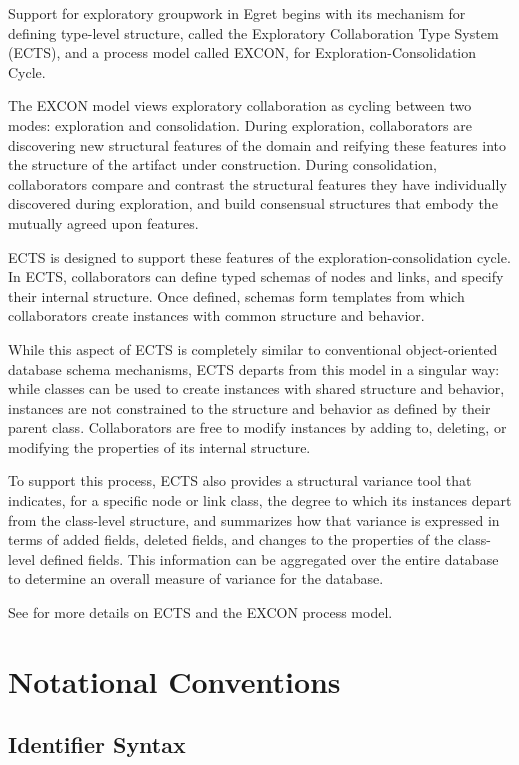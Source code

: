 Support for exploratory groupwork in Egret begins with its mechanism for
defining type-level structure, called the Exploratory Collaboration Type
System (ECTS), and a process model called EXCON, for 
Exploration-Consolidation Cycle.

The EXCON model views exploratory collaboration as cycling between two
modes: exploration and consolidation.  During exploration, collaborators are
discovering new structural features of the domain and reifying these features
into the structure of the artifact under construction.  During consolidation,
collaborators compare and contrast the structural features they have
individually discovered during exploration, and build consensual structures
that embody the mutually agreed upon features.

ECTS is designed to support these features of the exploration-consolidation
cycle.  In ECTS, collaborators can define typed schemas of nodes and links, and
specify their internal structure.  Once defined, schemas form templates from
which collaborators create instances with common structure and behavior.

While this aspect of ECTS is completely similar to conventional
object-oriented database schema mechanisms, ECTS departs from this model
in a singular way: while classes can be used to create instances with shared
structure and behavior, instances are not constrained to the structure and
behavior as defined by their parent class. Collaborators are free to modify
instances by adding to, deleting, or modifying the properties of its internal
structure.

To support this process, ECTS also provides a structural variance tool that
indicates, for a specific node or link class, the degree to which its instances
depart from the class-level structure, and summarizes how that variance is
expressed in terms of added fields, deleted fields, and changes to the
properties of the class-level defined fields.  This information can be
aggregated over the entire database to determine an overall measure of
variance for the database.

See \cite{csdl-92-01} for more details on ECTS and the EXCON process
model.

\section{Notational Conventions}
\label{conventions}

\subsection{Identifier Syntax}


